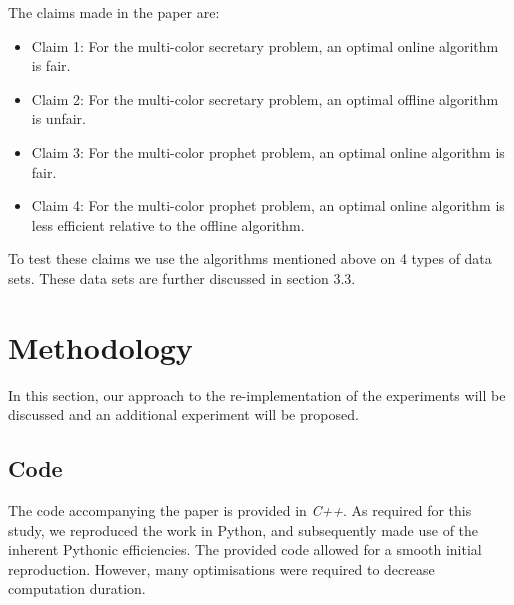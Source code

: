 The claims made in the \citep{correa2021fairness} paper are:
\begin{itemize}
  \item Claim 1: For the multi-color secretary problem, an optimal online algorithm is fair. \label{claim1}
  \item Claim 2: For the multi-color secretary problem, an optimal offline algorithm is unfair.
  \label{claim2}
  \item Claim 3: For the multi-color prophet problem, an optimal online algorithm is fair.
  \item Claim 4: For the multi-color prophet problem, an optimal online algorithm is less efficient relative to the offline algorithm.
\end{itemize}

To test these claims we use the algorithms mentioned above on 4 types of data sets. These data sets are further discussed in section 3.3.


\section{Methodology}\label{meth}
In this section, our approach to the re-implementation of the experiments will be discussed and an additional experiment will be proposed.

\subsection{Code}
The code accompanying the paper is provided in \textit{C++}. As required for this study, we reproduced the work in Python, and subsequently made use of the inherent Pythonic efficiencies. The provided code allowed for a smooth initial reproduction. However, many optimisations were required to decrease computation duration.

